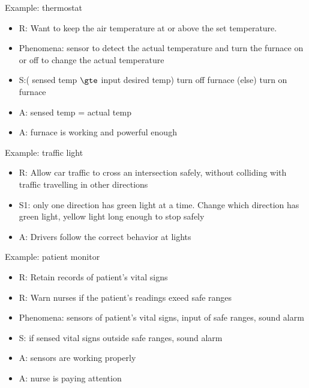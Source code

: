 \documentclass{article}
\begin{document}

Example: thermostat
\begin{itemize}
	\item R: Want to keep the air temperature at or above the set temperature.
	\item Phenomena: sensor to detect the actual temperature and turn the furnace on or off to change the actual temperature
	\item S:( sensed temp $\gte$ input desired temp) turn off furnace (else) turn on furnace
	\item A: sensed temp = actual temp
	\item A: furnace is working and powerful enough
\end{itemize}

Example: traffic light
\begin{itemize}
	\item R: Allow car traffic to cross an intersection safely, without colliding with traffic travelling in other directions
	\item S1: only one direction has green light at a time. Change which direction has green light, yellow light long enough to stop safely
	\item A: Drivers follow the correct behavior at lights
\end{itemize}

Example: patient monitor
\begin{itemize}
	\item R: Retain records of patient's vital signs
	\item R: Warn nurses if the patient's readings exeed safe ranges
	\item Phenomena: sensors of patient's vital signs, input of safe ranges, sound alarm
	\item S: if sensed vital signs outside safe ranges, sound alarm
	\item A: sensors are working properly
	\item A: nurse is paying attention
\end{itemize}
\end{document}
